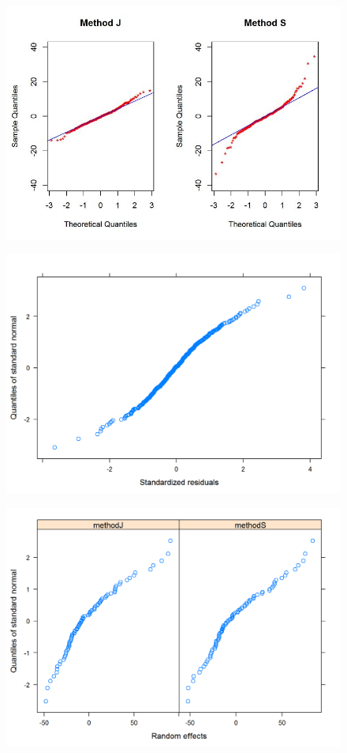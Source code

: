 \documentclass[12pt, a4paper]{report}
\theoremstyle{plain}
\theoremstyle{definition}
\theoremstyle{remark}
\begin{document}
	
	\begin{figure}[h!]
		\centering
		\includegraphics[width=1.1\linewidth]{images/Resid-newplot2}
		\caption{}
		\label{fig:Resid-newplot2}
	\end{figure}
	
	
	\begin{figure}[h!]
		\centering
		\includegraphics[width=0.9\linewidth]{images/ResidPlot3}
		\label{fig:ResidPlot3}
	\end{figure}
	

	\begin{figure}[h!]
		\centering
		\includegraphics[width=0.9\linewidth]{images/ResidPlot2}
		\caption{}
		\label{fig:ResidPlot2}
	\end{figure}
	
\end{document}
